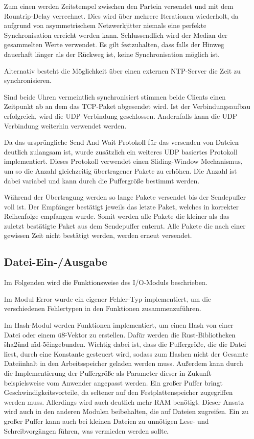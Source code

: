 Zum einen werden Zeitstempel zwischen den Partein versendet und mit dem Rountrip-Delay verrechnet. Dies wird über mehrere Iterationen wiederholt, da aufgrund von asymmetrischem Netzwerkjitter niemals eine perfekte Synchronisation erreicht werden kann. Schlussendlich wird der Median der gesammelten Werte verwendet. Es gilt festzuhalten, dass falls der Hinweg dauerhaft länger als der Rückweg ist, keine Synchronisation möglich ist.

Alternativ besteht die Möglichkeit über einen externen NTP-Server die Zeit zu synchronisieren.

Sind beide Uhren vermeintlich synchronisiert stimmen beide Clients einen Zeitpunkt ab an dem das TCP-Paket abgesendet wird. Ist der Verbindungsaufbau erfolgreich, wird die UDP-Verbindung geschlossen. Andernfalls kann die UDP-Verbindung weiterhin verwendet werden.

Da das ursprüngliche Send-And-Wait Protokoll für das versenden von Dateien deutlich zulangsam ist, wurde zusätzlich ein weiteres UDP basiertes Protokoll implementiert. Dieses Protokoll verwendet einen Sliding-Window Mechanismus, um so die Anzahl gleichzeitig übertragener Pakete zu erhöhen. Die Anzahl ist dabei variabel und kann durch die Puffergröße bestimmt werden.

Während der Übertragung werden so lange Pakete versendet bis der Sendepuffer voll ist. Der Empfänger bestätigt jeweils das letzte Paket, welches in korrekter Reihenfolge empfangen wurde. Somit werden alle Pakete die kleiner als das zuletzt bestätigte Paket aus dem Sendepuffer enternt. Alle Pakete die nach einer gewissen Zeit nicht bestätigt werden, werden erneut versendet.

\subsection{Datei-Ein-/Ausgabe}
Im Folgenden wird die Funktionsweise des I/O-Moduls beschrieben.

Im Modul Error wurde ein eigener Fehler-Typ implementiert, um die verschiedenen Fehlertypen in den Funktionen zusammenzuführen.

Im Hash-Modul werden Funktionen implementiert, um einen Hash von einer Datei oder einem \"u8\"-Vektor zu erstellen. Dafür werden die Rust-Bibliotheken \"sha2\" und \"md-5\" eingebunden. 
Wichtig dabei ist, dass die Puffergröße, die die Datei liest, durch eine Konstante gesteuert wird, sodass zum Hashen nicht der Gesamte Dateiinhalt in den Arbeitsspeicher geladen werden muss.
Außerdem kann durch die Implementierung der Puffergröße als Parameter dieser in Zukunft beispielsweise vom Anwender angepasst werden. Ein großer Puffer bringt Geschwindigkeitsvorteile, da seltener auf den Festplattenspeicher zugegriffen werden muss. Allerdings wird auch deutlich mehr RAM benötigt. Dieser Ansatz wird auch in den anderen Modulen beibehalten, die auf Dateien zugreifen. Ein zu großer Puffer kann auch bei kleinen Dateien zu unnötigen Lese- und Schreibvorgängen führen, was vermieden werden sollte.

